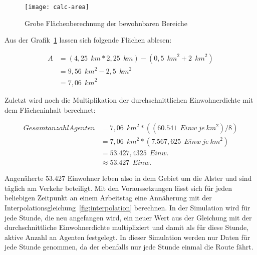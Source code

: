 \begin{figure}[h]
    \centering
    \texttt{[image: calc-area]}
    \caption{Grobe Flächenberechnung der bewohnbaren Bereiche}
    \label{fig:calc-area}
\end{figure}

Aus der Grafik~\ref{fig:calc-area} lassen sich folgende Flächen ablesen:

\begin{align}
    A &= (4,25~\unit{~km} * 2,25~\unit{~km}) - (0,5~\unit{~km}^2 + 2~\unit{~km}^2) \\
    &=  9,56~\unit{~km}^2 - 2,5~\unit{~km}^2 \\
    &=  7,06~\unit{~km}^2
\end{align}

Zuletzt wird noch die Multiplikation der durchschnittlichen Einwohnerdichte mit dem Flächeninhalt berechnet:

\begin{align}
    Gesamtanzahl Agenten &= 7,06~\unit{~km}^2 * ((60.541~\unit{~Einw~je~km}^2) / 8) \\
    &= 7,06~\unit{~km}^2 * (7.567,625~\unit{~Einw~je~km}^2) \\
    &= 53.427,4325~\unit{~Einw.} \\
    &\approx 53.427~\unit{~Einw.}
\end{align}

Angenäherte 53.427 Einwohner leben also in dem Gebiet um die Alster und sind täglich am Verkehr beteiligt.
Mit den Voraussetzungen lässt sich für jeden beliebigen Zeitpunkt an einem Arbeitstag eine Annäherung mit der Interpolationsgleichung~\ref{fig:interpolation} berechnen.
In der Simulation wird für jede Stunde, die neu angefangen wird, ein neuer Wert aus der Gleichung mit der durchschnittliche Einwohnerdichte multipliziert und damit als für diese Stunde, aktive Anzahl an Agenten festgelegt.
In dieser Simulation werden nur Daten für jede Stunde genommen, da der  ebenfalls nur jede Stunde einmal die Route fährt.
